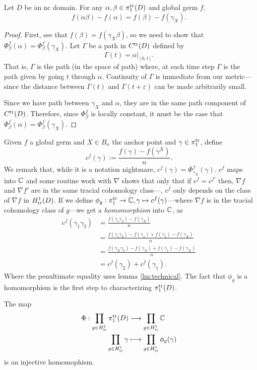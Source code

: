 \begin{lemma}%
\label{lm:technical}
  Let \(D\) be an nc domain. For any \(\alpha,\beta \in \pi_1^{\operatorname{tr}}(D)\) and
  global germ \(f\),
  \[
    f(\alpha\beta) - f(\alpha) = f(\beta) - f(\gamma_X).
  \]
\end{lemma}

\begin{proof}
  First, see that \(f(\beta)=f(\gamma_X\beta)\), so we need to show that
  \(\Phi_\beta^f(\alpha) = \Phi_\beta^f(\gamma_X)\). Let \(\Gamma\) be a path in
  \(C^{\operatorname{tr}}(D)\) defined by
  \[
    \Gamma(t) = \alpha\Big|_{[0,t]}.
  \]
  That is, \(\Gamma\) is the path (in the space of path) where, at each time
  step \(\Gamma\) is the path given by going \(t\) through \(\alpha\).
  Continuity of \(\Gamma\) is immediate from our metric---since the distance
  between \(\Gamma(t)\) and \(\Gamma(t+\varepsilon)\) can be made arbitrarily
  small.

  Since we have path between \(\gamma_X\) and \(\alpha\), they are in the same
  path component of \(C^{\operatorname{tr}}(D)\). Therefore, since \(\Phi_\beta^f\) is locally
  constant, it must be the case that \(\Phi_\beta^f(\alpha) = \Phi_\beta^f(\gamma_X)\).
\end{proof}

Given \(f\) a global germ and \(X \in B_n\) the anchor point and
\(\gamma \in \pi_1^{\operatorname{tr}}\), define
\[
  c^f(\gamma) := \frac{f(\gamma)-f(\gamma^X)}{n}.
\]
We remark that, while it is a notation nightmare,
\(c^f(\gamma) = \Phi^f_{\gamma_X}(\gamma)\). \(c^f\) maps into \(\mathbb{C} \) and some
routine work with \(\nabla\) shows that only that if \(c^f=c^{f'}\) then,
\(\nabla f\) and \(\nabla f'\) are in the same tracial
cohomology class---\ie, \(c^f\) only depends on the class of \(\nabla f \) in
\(H^1_{\operatorname{tr}}(D)\). If we define
\(\phi_g: \pi_1^{\operatorname{tr}}\to \mathbb{C} , \gamma \mapsto c^f(\gamma)\)---where \(\nabla f\)
is in the tracial cohomology class of \(g\)---we get a
\emph{homomorphism} into \(\mathbb{C} \), as
\begin{align*}
  c^f(\gamma_1\gamma_2) &= \frac{f(\gamma_1\gamma_2) - f(\gamma_X)}{n} \\
             &= \frac{f(\gamma_1\gamma_2) - f(\gamma_1) + f(\gamma_1) -f(\gamma_X)}{n} \\
             &= \frac{f(\gamma_X\gamma_2) - f(\gamma_X) + f(\gamma_1) -f(\gamma_X)}{n} \\
             &= c^f(\gamma_2) + c^f(\gamma_1).
\end{align*}
Where the penultimate equality uses lemma \ref{lm:technical}.
The fact that \(\phi_g\) is a homomorphism is the first step to characterizing
\(\pi_1^{\operatorname{tr}}(D)\).
\begin{lemma}
  The map
  \begin{align*}
	  \Phi: \prod_{g \in H^1_{\operatorname{tr}}} \pi_1^{\operatorname{tr}}(D) &\longrightarrow \prod_{g \in H^1_{\operatorname{tr}}}\mathbb{C}  \\
    \prod_{g \in H^1_{\operatorname{tr}}} \gamma &\longmapsto \prod_{g \in H^1_{\operatorname{tr}}} \phi_g(\gamma)
  \end{align*}
  is an injective homomophism.
\end{lemma}

